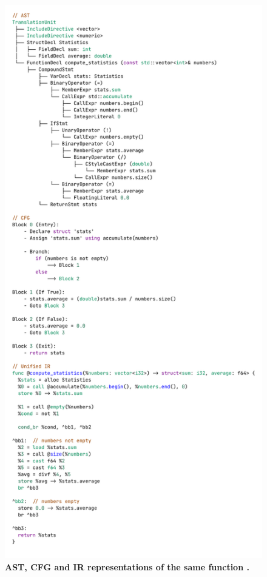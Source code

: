 \documentclass[twocolumn]{article}
\begin{document}
\begin{figure}[htbp]
\begin{minipage}{0.48\textwidth}
        \includegraphics[width=\textwidth]{figures/unified_ir.png}
        \caption{\textbf{AST, CFG and IR representations of the same function \cite{illinois-ir}.}}
        \label{fig:translate-overview2}
    \end{minipage}
\end{figure}
\end{document}
